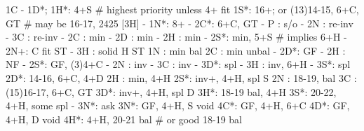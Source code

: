 1C - 1D*;
1H*: 4+S  # highest priority unless 4+ fit
1S*: 16+; or (13)14-15, 6+C, GT  # may be 16-17, 2425 [3H]
   - 1N*: 8+
        - 2C*: 6+C, GT
             - P  : s/o
             - 2N : re-inv
             - 3C : re-inv
   - 2C : min
   - 2D : min
   - 2H : min
   - 2S*: min, 5+S  # implies 6+H
   - 2N+: C fit ST
   - 3H : solid H ST
1N : min bal
2C : min unbal
   - 2D*: GF
   - 2H : NF
   - 2S*: GF, (3)4+C
   - 2N : inv
   - 3C : inv
   - 3D*: spl
   - 3H : inv, 6+H
   - 3S*: spl
2D*: 14-16, 6+C, 4+D
2H : min, 4+H
2S*: inv+, 4+H, spl S
2N : 18-19, bal
3C : (15)16-17, 6+C, GT
3D*: inv+, 4+H, spl D
3H*: 18-19 bal, 4+H
3S*: 20-22, 4+H, some spl
   - 3N*: ask
3N*: GF, 4+H, S void 
4C*: GF, 4+H, 6+C
4D*: GF, 4+H, D void 
4H*: 4+H, 20-21 bal  # or good 18-19 bal
